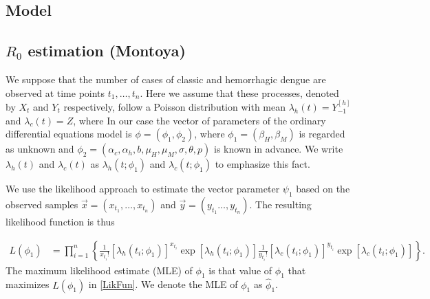 \documentclass[draft, openbib]{imammb}
\numberwithin{equation}{section}
\begin{document}
        \subsection*{Model}
            
            
            
        \subsection{$R_0$ estimation (Montoya)}
        We suppose that the number of cases of classic and hemorrhagic
        dengue are observed at time points $t_{1}, \dots , t_{n}$.
        Here we assume that these processes, denoted by $X_{t}$ and
        $Y_{t}$ respectively, follow a Poisson distribution with mean
        $\lambda_{h}\left(t\right)=Y_{-1}^{[h]}$ and
        $\lambda_{c}\left(t\right)=Z$, where
        In our case the vector of parameters of the ordinary differential
        equations model is $\phi=\left(\phi_{1},\phi_{2}\right)$, where
        $\phi_{1}=\left(\beta_{H},\beta_{M}\right)$ is regarded as unknown and
        $\phi_{2}=\left(\alpha_{c},\alpha_{h},b,\mu_{H},\mu_{M},\sigma,\theta,p\right)$
        is known in advance. We write $\lambda_{h}\left(t\right)$ and
        $\lambda_{c}\left(t\right)$ as $\lambda_{h}\left(t;\phi_{1}\right)$
        and $\lambda_{c}\left(t;\phi_{1}\right)$ to emphasize this fact.
 
        We use the likelihood approach to estimate the vector
        parameter  $\psi_{1}$ based on the observed samples
        $\vec{x}=\left(x_{t_1}, \dots , x_{t_n} \right)$ and
        $\vec{y}=\left(y_{t_1} \dots , y_{t_n} \right)$. The resulting
        likelihood function is thus

    \begin{equation}
        \begin{split}
            L \left( \phi_{1} \right)
             &= \prod_{i = 1} ^ {n} 
             \left \{ 
                 \frac{1}{x_{t_i}!}
                     \left[\lambda_{h}
                         \left(t_{i};\phi_{1}\right)
                     \right] ^ {x_{t_i}} \exp
                     \left[
                         \lambda_{h} \left(t_{i}; \phi_{1} \right)
                     \right] 
             \right. 
            \left.
                 \frac{1}{y_{t_i}!}
                 \left[\lambda_{c}
                     \left(t_{i};\phi_{1}\right)
                 \right] ^ {y_{t_i}}
                 \exp
                 \left[
                     \lambda_{c}
                     \left(t_{i};\phi_{1}\right)
                 \right]
             \right\}.\label{LikFun}
        \end{split}
    \end{equation}
    The maximum likelihood estimate (MLE) of $\phi_{1}$ is that value 
    of $\phi_{1}$ that maximizes $L\left(\phi_{1}\right)$ in 
    \eqref{LikFun}. We denote the MLE of $\phi_{1}$ as $\hat{\phi}_{1}$.
\end{document}
